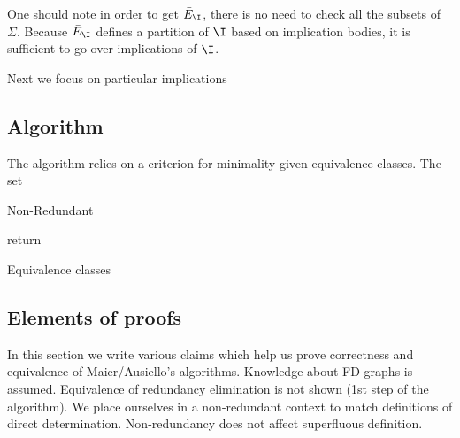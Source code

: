 One should note in order to get $\bar{E}_{\I}$, there is no need to check all
the subsets of $\Sigma$. Because $\bar{E}_{\I}$ defines a partition of $\I$ 
based on implication bodies, it is sufficient to go over implications of $\I$.

\vspace{1.2em}

Next we focus on particular implications


\subsection{Algorithm}

The algorithm relies on a criterion for minimality given equivalence classes. 
The set 


\begin{algorithm}[H]

\BlankLine
\BlankLine



\caption{Non-Redundant}
\label{alg:Nonredun}
\end{algorithm}

\vspace{1.2em}

\begin{algorithm}[H]

\BlankLine
\BlankLine

return \;
	

\caption{Equivalence classes}
\label{alg:Equiv}
	
\end{algorithm}


\subsection{Elements of proofs}

In this section we write various claims which help us prove correctness and 
equivalence of Maier/Ausiello's algorithms. Knowledge about FD-graphs is 
assumed. Equivalence of redundancy elimination is not shown (1st step of 
the algorithm). We place ourselves in a non-redundant context to match
definitions of direct determination. Non-redundancy does not affect superfluous
definition.

